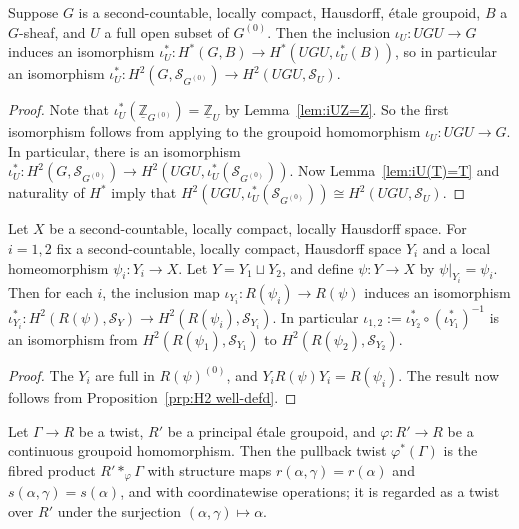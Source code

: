 \documentclass[12pt,a4paper]{amsart}
\newcommand{\field}[1]{\mathbb{#1}}
\newcommand{\ZZ}{\field{Z}}
\newcommand{\Tgerms}{\mathcal{S}}
\begin{document}
\begin{prop}\label{prp:H2 well-defd}
Suppose $G$ is a second-countable, locally compact, Hausdorff, \'etale groupoid, $B$ a $G$-sheaf,
and $U$ a full open subset of $G^{(0)}$. Then the inclusion $\iota_U : UGU \to G$ induces an
isomorphism $\iota_U^* : H^*(G,B) \to H^*(UGU, \iota_U^*(B))$, so in particular an isomorphism
$\iota_U^*:H^2(G,\Tgerms_{G^{(0)}}) \to H^2(UGU,
 \Tgerms_U)$.
\end{prop}
\begin{proof}
Note that $\iota^*_U(\underline{\ZZ}_{G^{(0)}}) = \underline{\ZZ}_U$ by Lemma~\ref{lem:iUZ=Z}.  So
the first isomorphism follows from applying \cite[Proposition~1.8]{Kumjian1988} to the groupoid
homomorphism $\iota_U : UGU \to G$.  In particular, there is an isomorphism
$\iota_U^*:H^2(G,\Tgerms_{G^{(0)}}) \to H^2(UGU, \iota_U^*( \Tgerms_{G^{(0)}}))$. Now
Lemma~\ref{lem:iU(T)=T} and naturality of $H^*$ imply that $H^2(UGU, \iota_U^*( \Tgerms_{G^{(0)}}))
\cong H^2(UGU, \Tgerms_U)$.
\end{proof}

\begin{cor}\label{cor:Br well-defd}
Let $X$ be a second-countable, locally compact, locally
Hausdorff space. For $i = 1,2$ fix a second-countable, locally
compact, Hausdorff space $Y_i$ and a local homeomorphism $\psi_i
: Y_i \to X$. Let $Y = Y_1 \sqcup Y_2$, and define $\psi : Y \to
X$ by $\psi|_{Y_i} = \psi_i$. Then for each $i$, the inclusion
map $\iota_{Y_i} : R(\psi_i) \to R(\psi)$ induces an isomorphism
$\iota_{Y_i}^* : H^2(R(\psi), \Tgerms_Y) \to H^2(R(\psi_i),
\Tgerms_{Y_i})$. In particular $\iota_{1,2} :=
\iota^*_{Y_2}\circ (\iota^*_{Y_1})^{-1}$ is an isomorphism from
$H^2(R(\psi_1), \Tgerms_{Y_1})$ to $H^2(R(\psi_2),
\Tgerms_{Y_2})$.
\end{cor}
\begin{proof}
The $Y_i$ are full in $R(\psi)^{(0)}$, and $Y_i R(\psi) Y_i =
R(\psi_i)$. The result now follows from Proposition~\ref{prp:H2
well-defd}.
\end{proof}

Let $\Gamma \to R$ be a twist,  $R'$ be a principal \'etale
groupoid, and  $\varphi : R' \to R$ be a continuous groupoid
homomorphism. Then the pullback twist $\varphi^*(\Gamma)$ is the
fibred product $R' \ast_\varphi \Gamma$ with structure maps
$r(\alpha,\gamma) = r(\alpha)$ and $s(\alpha,\gamma) =
s(\alpha)$, and with coordinatewise operations; it is regarded
as a twist over $R'$ under the surjection $(\alpha,\gamma)
\mapsto \alpha$.
\end{document}
